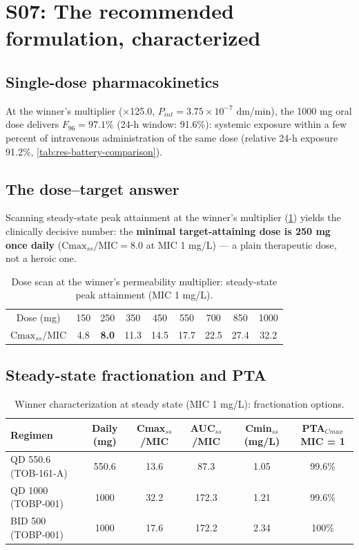 \section{S07: The recommended formulation, characterized}
\label{sec:res-ga-winner}

\subsection{Single-dose pharmacokinetics}
At the winner's multiplier ($\times$125.0, $P_{int} = 3.75\times10^{-7}$ dm/min), the 1000 mg oral dose delivers \textbf{$F_{96} = 97.1\%$} (24-h window: 91.6\%): systemic exposure within a few percent of intravenous administration of the same dose (relative 24-h exposure 91.2\%, \cref{tab:res-battery-comparison}).

\subsection{The dose--target answer}
Scanning steady-state peak attainment at the winner's multiplier (\cref{tab:res-dosescan}) yields the clinically decisive number: the \textbf{minimal target-attaining dose is 250 mg once daily} ($\mathrm{Cmax}_{ss}/\mathrm{MIC} = 8.0$ at MIC 1 mg/L) --- a plain therapeutic dose, not a heroic one.

\begin{table}[htbp]
\centering
\caption{Dose scan at the winner's permeability multiplier: steady-state peak attainment (MIC 1 mg/L).}
\label{tab:res-dosescan}
\begin{tabular}{ccccccccc}
\toprule
Dose (mg) & 150 & 250 & 350 & 450 & 550 & 700 & 850 & 1000 \\
$\mathrm{Cmax}_{ss}$/MIC & 4.8 & \textbf{8.0} & 11.3 & 14.5 & 17.7 & 22.5 & 27.4 & 32.2 \\
\bottomrule
\end{tabular}
\end{table}

\subsection{Steady-state fractionation and PTA}
\begin{table}[htbp]
\centering
\caption{Winner characterization at steady state (MIC 1 mg/L): fractionation options.}
\label{tab:res-ga-frac}
\small
\footnotesize\setlength{\tabcolsep}{3pt}
\begin{tabular}{lccccc}
\toprule
Regimen & Daily (mg) & Cmax$_{ss}$/MIC & AUC$_{ss}$/MIC & Cmin$_{ss}$ (mg/L) & PTA$_{Cmax}$ MIC = 1 \\
\midrule
QD 550.6 (TOB-161-A) & 550.6 & 13.6 & 87.3 & 1.05 & 99.6\% \\
QD 1000 (TOBP-001)   & 1000  & 32.2 & 172.3 & 1.21 & 99.6\% \\
BID 500 (TOBP-001)   & 1000  & 17.6 & 172.2 & 2.34 & 100\% \\
\bottomrule
\end{tabular}
\end{table}

